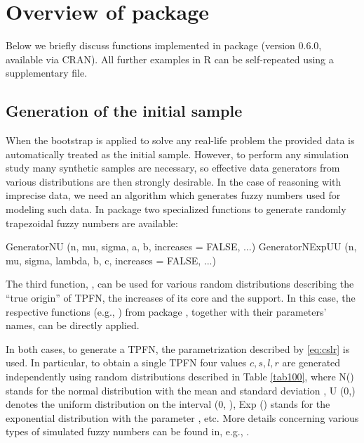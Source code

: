 

\section{Overview of  package}
\label{over}

Below we briefly discuss functions implemented in  package (version 0.6.0, available via CRAN).
All further examples in R can be self-repeated using a supplementary file.


\subsection{Generation of the initial sample}
\label{genofinsa}

When the bootstrap is applied to solve any real-life problem the provided data is automatically treated as the initial sample. 
However, to perform any simulation study many synthetic samples are necessary, so effective data generators from various distributions are then strongly desirable. In the case of reasoning with imprecise data, we need an algorithm which generates fuzzy numbers used for modeling such data. In  package two specialized functions to generate randomly trapezoidal fuzzy numbers are available:
\begin{example}
GeneratorNU (n, mu, sigma, a, b, increases = FALSE, ...)
GeneratorNExpUU (n, mu, sigma, lambda, b, c, increases = FALSE, ...)
\end{example}
The third function, , can be used for various random distributions describing the ``true origin'' of TPFN, the increases of its core and the support.
In this case, the respective functions (e.g., ) from  package \citep{RMan}, together with their parameters' names, can be directly applied.

In both cases, to generate a TPFN, the parametrization described by \eqref{eq:cslr} is used. In particular, to obtain a single TPFN four values $c,s,l,r$ are generated independently using random distributions described in Table \ref{tab100}, where N() stands for the normal distribution with the mean  and standard deviation , U (0,) denotes the uniform distribution on the interval (0, ), Exp () stands for the exponential distribution with the parameter , etc.
More details concerning various types of simulated fuzzy numbers can be found in, e.g., \cite{grzegorzewski_ijcis2020,10.1007/978-3-031-08974-9_39}.

